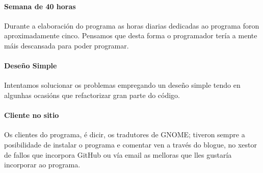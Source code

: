 \paragraph{Semana de 40 horas} Durante a elaboración do programa as horas diarias dedicadas ao programa foron aproximadamente cinco. Pensamos que desta forma o programador tería a mente máis descansada para poder programar.

\paragraph{Deseño Simple} Intentamos solucionar os problemas empregando un deseño simple tendo en algunhas ocasións que refactorizar gran parte do código.

\paragraph{Cliente no sitio} Os clientes do programa, é dicir, os tradutores de GNOME; tiveron sempre a posibilidade de instalar o programa e comentar ven a través do blogue, no xestor de fallos que incorpora GitHub ou vía email as melloras que lles gustaría incorporar ao programa.
